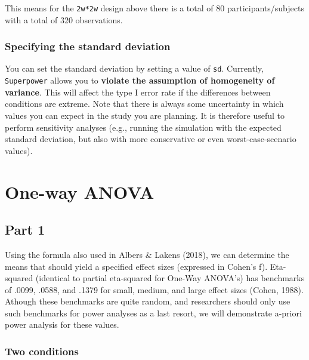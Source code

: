 \documentclass[]{book}
\begin{document}
This means for the \texttt{2w*2w} design above there is a total of 80 participants/subjects with a total of 320 observations.

\hypertarget{specifying-the-standard-deviation}{%
\subsection{Specifying the standard deviation}\label{specifying-the-standard-deviation}}

You can set the standard deviation by setting a value of \texttt{sd}. Currently, \texttt{Superpower} allows you to \textbf{violate the assumption of homogeneity of variance}. This will affect the type I error rate if the differences between conditions are extreme. Note that there is always some uncertainty in which values you can expect in the study you are planning. It is therefore useful to perform sensitivity analyses (e.g., running the simulation with the expected standard deviation, but also with more conservative or even worst-case-scenario values).

\hypertarget{one-way-anova}{%
\chapter{One-way ANOVA}\label{one-way-anova}}

\hypertarget{part-1}{%
\section{Part 1}\label{part-1}}

Using the formula also used in Albers \& Lakens (2018), we can determine the means that should yield a specified effect sizes (expressed in Cohen's f). Eta-squared (identical to partial eta-squared for One-Way ANOVA's) has benchmarks of .0099, .0588, and .1379 for small, medium, and large effect sizes (Cohen, 1988). Athough these benchmarks are quite random, and researchers should only use such benchmarks for power analyses as a last resort, we will demonstrate a-priori power analysis for these values.

\hypertarget{two-conditions}{%
\subsection{Two conditions}\label{two-conditions}}
\end{document}
